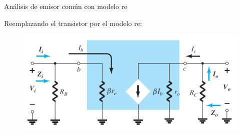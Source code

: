 \documentclass[t,aspectratio=169]{beamer}
\begin{document}
\begin{frame}{Análisis de emisor común con modelo re}

Reemplazando el transistor por el modelo re:

\begin{figure}[H]
    \centering
    \includegraphics[width=\textwidth]{figuras/analisis_re_ec_3.png}
\end{figure}

\end{frame}
\end{document}
